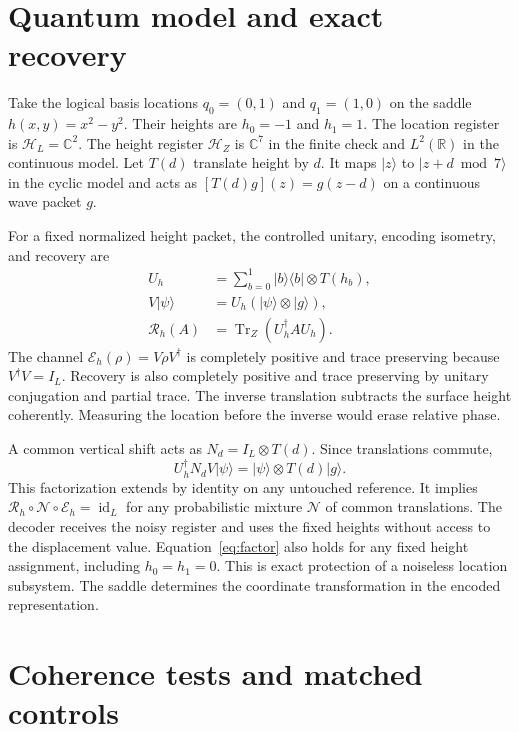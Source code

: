 \documentclass[aip,adv,reprint,floatfix]{revtex4-2}
\begin{document}
\section{Quantum model and exact recovery}

Take the logical basis locations \(q_0=(0,1)\) and \(q_1=(1,0)\) on the saddle \(h(x,y)=x^2-y^2\). Their heights are \(h_0=-1\) and \(h_1=1\). The location register is \(\mathcal H_L=\mathbb C^2\). The height register \(\mathcal H_Z\) is \(\mathbb C^7\) in the finite check and \(L^2(\mathbb R)\) in the continuous model. Let \(T(d)\) translate height by \(d\). It maps \(|z\rangle\) to \(|z+d\bmod 7\rangle\) in the cyclic model and acts as \([T(d)g](z)=g(z-d)\) on a continuous wave packet \(g\).

For a fixed normalized height packet, the controlled unitary, encoding isometry, and recovery are
\begin{align}
U_h &= \sum_{b=0}^1 |b\rangle\langle b|\otimes T(h_b),\\
V|\psi\rangle &= U_h(|\psi\rangle\otimes |g\rangle),\\
\mathcal R_h(A)&=\operatorname{Tr}_Z(U_h^\dagger A U_h).
\end{align}
The channel \(\mathcal E_h(\rho)=V\rho V^\dagger\) is completely positive and trace preserving because \(V^\dagger V=I_L\). Recovery is also completely positive and trace preserving by unitary conjugation and partial trace. The inverse translation subtracts the surface height coherently. Measuring the location before the inverse would erase relative phase.

A common vertical shift acts as \(N_d=I_L\otimes T(d)\). Since translations commute,
\begin{equation}
U_h^\dagger N_d V|\psi\rangle
=|\psi\rangle\otimes T(d)|g\rangle .
\label{eq:factor}
\end{equation}
This factorization extends by identity on any untouched reference. It implies \(\mathcal R_h\circ\mathcal N\circ\mathcal E_h=\operatorname{id}_L\) for any probabilistic mixture \(\mathcal N\) of common translations. The decoder receives the noisy register and uses the fixed heights without access to the displacement value. Equation~\eqref{eq:factor} also holds for any fixed height assignment, including \(h_0=h_1=0\). This is exact protection of a noiseless location subsystem.\cite{KLV} The saddle determines the coordinate transformation in the encoded representation.

\section{Coherence tests and matched controls}
\end{document}
